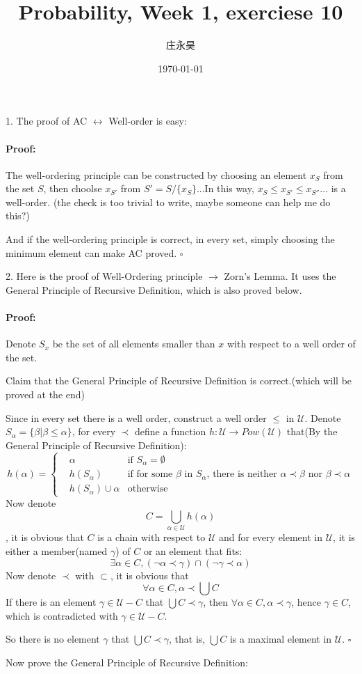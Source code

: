 \documentclass{article}
\title{Probability, Week 1, exerciese 10}
\author{庄永昊}
\date{\today}
\newenvironment{myproof}{\ignorespaces\paragraph{Proof:}}{\hfill $\square$\par\noindent}
\begin{document}
\maketitle

1. The proof of AC $\leftrightarrow$ Well-order is easy: 
\begin{myproof}
The well-ordering principle can be constructed by choosing an element $x_S$ from the set $S$, 
then choolse $x_{S'}$ from $S'=S/\{x_S\}$...In this way, $x_S\leq x_{S'}\leq x_{S''}...$ is a well-order.
(the check is too trivial to write, maybe someone can help me do this?) 

And if the well-ordering principle is correct, in every set, simply choosing the minimum element can make AC proved. 
\end{myproof}

2. Here is the proof of Well-Ordering principle $\rightarrow$ Zorn's Lemma. It uses the General Principle of Recursive Definition, 
which is also proved below. 

\begin{myproof}
    Denote $S_x$ be the set of all elements smaller than $x$ with respect to a well order of the set. 

    Claim that the General Principle of Recursive Definition is correct.(which will be proved at the end)

    Since in every set there is a well order, construct a well order $\leq$ in $\mathscr U$. 
    Denote $S_\alpha=\{\beta|\beta\leq\alpha\}$, for every $\prec$
    define a function $h:\mathscr U\rightarrow Pow(\mathscr U)$ that(By the General Principle of Recursive Definition): 
    \begin{equation}
        h(\alpha)=\left\{
        \begin{aligned}
            &\alpha&\text{if $S_\alpha=\emptyset$}\\
            &h(S_\alpha)&\text{if for some $\beta$ in $S_\alpha$, there is neither $\alpha\prec\beta$ nor $\beta\prec\alpha$}\\
            &h(S_\alpha)\cup\alpha&\text{otherwise}
        \end{aligned}
        \right.
    \end{equation}
    Now denote $$C=\bigcup_{\alpha\in\mathscr U}h(\alpha)$$, 
    it is obvious that $C$ is a chain with respect to $\mathscr U$ and for every element in $\mathscr U$, 
    it is either a member(named $\gamma$) of $C$ or an element that fits: 
    $$\exists \alpha\in C, (\neg\alpha\prec\gamma)\cap(\neg\gamma\prec\alpha)$$
    Now denote $\prec$ with $\subset$, it is obvious that 
    $$\forall \alpha\in C, \alpha\prec\bigcup C$$
    If there is an element $\gamma\in\mathscr U-C$ that $\bigcup C\prec\gamma$, 
    then $\forall\alpha\in C, \alpha\prec\gamma$, hence $\gamma\in C$, which is contradicted with $\gamma\in\mathscr U-C$.

    So there is no element $\gamma$ that $\bigcup C\prec\gamma$, that is, $\bigcup C$ is a maximal element in $\mathscr U$.
\end{myproof}
    Now prove the General Principle of Recursive Definition:
\end{document}
